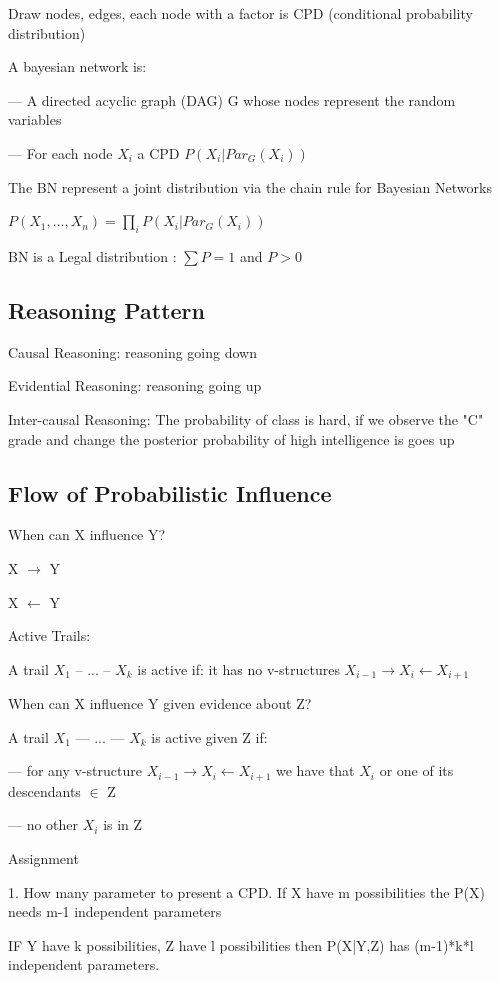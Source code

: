 \documentclass{book}
\begin{document}
Draw nodes, edges, each node with a factor is CPD (conditional probability distribution)

A bayesian network is:

--- A directed acyclic graph (DAG) G whose nodes represent the random variables

--- For each node $X_i$ a CPD $P(X_i|Par_G(X_i))$

The BN represent a joint distribution via the chain rule for Bayesian Networks

$P(X_1,...,X_n) = \prod_{i} P(X_i|Par_G(X_i))$

BN is a Legal distribution : $\sum P=1$ and $P>0$

\subsection{Reasoning Pattern}
Causal Reasoning: reasoning going down

Evidential Reasoning: reasoning going up

Inter-causal Reasoning: The probability of class is hard, if we observe the "C" grade and change the posterior probability of high intelligence is goes up

\subsection{Flow of Probabilistic Influence}
When can X influence Y?

X $\rightarrow$ Y

X $\leftarrow$ Y

Active Trails: 

A trail $X_1$ -- ... -- $X_k$ is active if: it has no v-structures $X_{i-1} \rightarrow X_i \leftarrow X_{i+1}$

When can X influence Y given evidence about Z?

A trail $X_1$ --- ... --- $X_k$ is active given Z if:

--- for any v-structure $X_{i-1} \rightarrow X_i \leftarrow X_{i+1} $ we have that $X_i$ or one of its descendants $\in$ Z

--- no other $X_i$ is in Z

Assignment

1. How many parameter to present a CPD. If X have m possibilities the P(X) needs m-1 independent parameters

IF Y have k possibilities, Z have l possibilities then P(X|Y,Z) has (m-1)*k*l independent parameters.
\end{document}
